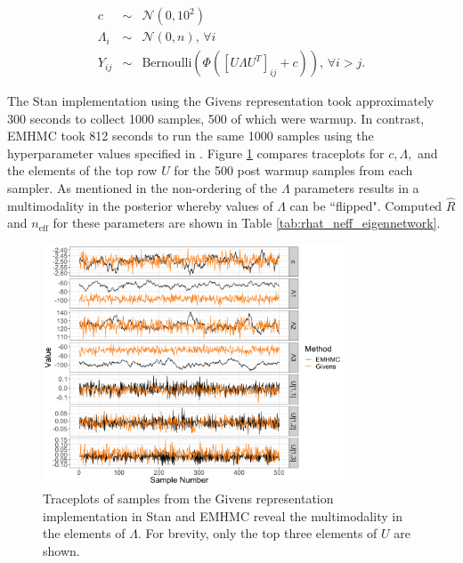 \documentclass[ba]{imsart}
\numberwithin{equation}{section}
\theoremstyle{plain}
\begin{document}
\begin{eqnarray}
c &\sim& \mathcal{N}(0, 10^2)\\
\Lambda_i &\sim& \mathcal{N}(0, n),\, \forall i\\
Y_{ij} &\sim& \mathrm{Bernoulli} \left(\Phi ([U \Lambda U^T]_{ij} + c) \right),\, \forall i > j.
\end{eqnarray}

\noindent The Stan implementation using the Givens representation took approximately 300 seconds to collect 1000 samples, 500 of which were warmup. In contrast, EMHMC took 812 seconds to run the same 1000 samples using the hyperparameter values specified in  \cite{byrne2013geodesic}. Figure \ref{fig:eigennetwork_traceplots} compares traceplots for $c, \Lambda,$ and the elements of the top row $U$ for the 500 post warmup samples from each sampler. As mentioned in \cite{byrne2013geodesic} the non-ordering of the $\Lambda$ parameters results in a multimodality in the posterior whereby values of $\Lambda$ can be ``flipped". Computed $\hat{R}$ and $n_{\mathrm{eff}}$ for these parameters are shown in Table \ref{tab:rhat_neff_eigennetwork}.

\begin{figure}[h]
\centering
\vspace{.1in}
\includegraphics[width=0.8\textwidth]{figures/eigennetwork_traceplots.png}
\vspace{.05in}
\caption{Traceplots of samples from the Givens representation implementation in Stan and EMHMC reveal the multimodality in the elements of $\Lambda$. For brevity, only the top three elements of $U$ are shown.}
\label{fig:eigennetwork_traceplots}
\end{figure}
\end{document}

